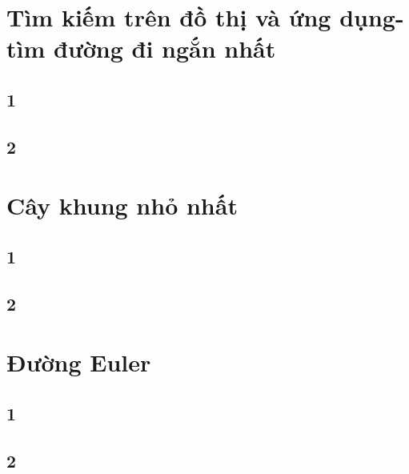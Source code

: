 \documentclass[12pt,oneside]{book}
\begin{document}
\chapter{Tìm kiếm trên đồ thị và ứng dụng-tìm đường đi ngắn nhất}
\section{1}
\section{2}
\chapter{Cây khung nhỏ nhất}
\section{1}
\section{2}
\chapter{Đường Euler}
\section{1}
\section{2}
\end{document}
